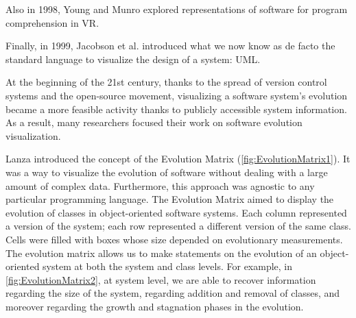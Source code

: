Also in 1998, Young and Munro \cite{Young1998} explored representations of software for program comprehension in VR. 

Finally, in 1999, Jacobson et al. \cite{Jacobson1999} introduced what we now know as de facto the standard language to visualize the design of a system: UML. 



At the beginning of the 21st century, thanks to the spread of version control systems and the open-source movement, 
visualizing a software system's evolution became a more feasible activity thanks to publicly accessible system information.
As a result, many researchers focused their work on software evolution visualization.

Lanza \cite{Lanza2001} introduced the concept of the Evolution Matrix (\autoref{fig:EvolutionMatrix1}). 
It was a way to visualize the evolution of software without dealing with a large amount of complex data. 
Furthermore, this approach was agnostic to any particular programming language. 
The Evolution Matrix aimed to display the evolution of classes in object-oriented software systems. 
Each column represented a version of the system; each row represented a different version of the same class.
Cells were filled with boxes whose size depended on evolutionary measurements. 
The evolution matrix allows us to make statements on the evolution of an object-oriented system at both the system and class levels. For example, in \autoref{fig:EvolutionMatrix2}, at system level, we are able to recover information regarding the size of the system, regarding addition and removal of classes, and moreover regarding the growth and stagnation phases in the evolution. 


